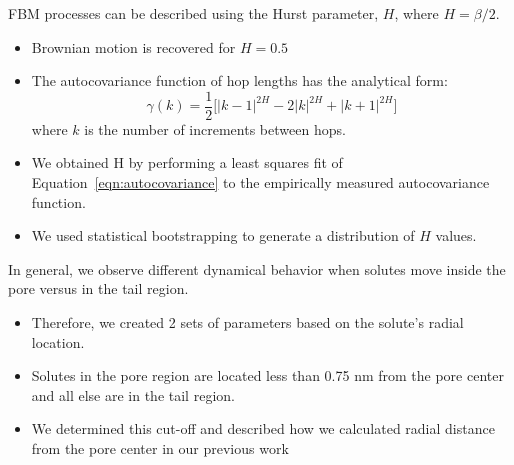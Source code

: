 \documentclass{article}
\begin{document}
  \noindent FBM processes can be described using the Hurst parameter, $H$, where 
  $H = \beta/2$.
  \begin{itemize}
  	\item Brownian motion is recovered for $H = 0.5$
	\item The autocovariance function of hop lengths has the analytical form:~\cite{mandelbrot_fractional_1968}
    \begin{equation}
	\gamma(k) = \dfrac{1}{2}\bigg[|k-1|^{2H} - 2|k|^{2H} + |k+1|^{2H}\bigg]
	\label{eqn:autocovariance}
	\end{equation}
	where $k$ is the number of increments between hops.
	\item We obtained H by performing a least squares fit of Equation~\ref{eqn:autocovariance}
	to the empirically measured autocovariance function.
	\item We used statistical bootstrapping to generate a distribution of $H$ 
	values. %
  \end{itemize}
  
  In general, we observe different dynamical behavior when solutes move inside the
  pore versus in the tail region.
  \begin{itemize}
    \item Therefore, we created 2 sets of parameters based on the solute's radial location.
    \item Solutes in the pore region are located less than 0.75 nm from the pore center and
    all else are in the tail region. 
    \item We determined this cut-off and described how we calculated radial 
    distance from the pore center in our previous work~\cite{coscia_chemically_2019}
  \end{itemize}

\end{document}
